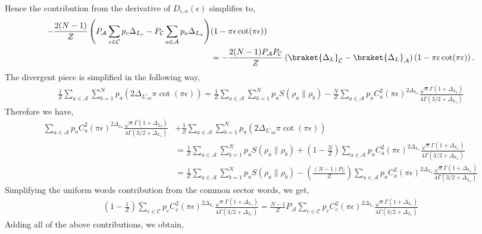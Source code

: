 \documentclass[11pt]{article}
\newcommand{\ep}{\epsilon}
\newcommand{\nn}{\nonumber}
\newcommand{\lb}{\left(}
\newcommand{\rb}{\right)}
\begin{document}
Hence the contribution from the derivative of $D_{i,n}(\ep)$ simplifies to,
\begin{align}
    -\frac{2(N-1)}{Z} \lb  P_\mathcal{A}\sum_{c\in\mathcal{C}} p_c\Delta_{L_c} - P_\mathcal{C} \sum_{a\in\mathcal{A}} p_a\Delta_{L_a} \rb &(1-\pi \ep\cot(\pi\ep))  \nn \\&=-\frac{2(N-1) P_\mathcal{A} P_\mathcal{C}}{Z}\lb\braket{\Delta_L}_{\mathcal{C}} - \braket{\Delta_L}_\mathcal{A}\rb \lb1-\pi\ep \cot(\pi\ep)\rb.
\end{align}
The divergent piece is simplified in the following way,
\begin{align}
    \frac{1}{Z}\sum_{a\in \mathcal{A}}\sum_{b=1}^Np_a\lb2\Delta_{L'_{ab}}\pi \cot(\pi\ep)\rb = \frac{1}{Z}\sum_{a\in \mathcal{A}}\sum_{b=1}^Np_a S(\rho_a \| \rho_b) - \frac{N}{Z}\sum_{a\in \mathcal{A}} p_a C_a^2
(\pi\ep)^{2\Delta_{L_a}}
\frac{\sqrt \pi \Gamma(1+ \Delta_{L_a})}{4\Gamma(3/2 + \Delta_{L_a})}
\end{align}
Therefore we have,
\begin{align}
    \sum_{a\in\mathcal{A}}p_a C_a^2
(\pi\ep)^{2\Delta_{L_a}}
\frac{\sqrt \pi \Gamma(1+ \Delta_{L_a})}{4\Gamma(3/2 + \Delta_{L_a})} &+ \frac{1}{Z}\sum_{a\in \mathcal{A}}\sum_{b=1}^Np_a\lb2\Delta_{L'_{ab}}\pi \cot(\pi\ep)\rb  \nn\\&=\frac{1}{Z}  \sum_{a\in \mathcal{A}}\sum_{b=1}^N p_a S(\rho_a\| \rho_b) 
+ \lb1-\frac{N}{Z}\rb\sum_{a\in\mathcal{A}}p_aC_a^2
(\pi\ep)^{2\Delta_{L_a}}
\frac{\sqrt \pi \Gamma(1+ \Delta_{L_a})}{4\Gamma(3/2 + \Delta_{L_a})} \\
&= \frac{1}{Z}  \sum_{a\in \mathcal{A}}\sum_{b=1}^N p_a S(\rho_a\| \rho_b) 
- \lb\frac{(N-1)P_\mathcal{C}}{Z}\rb\sum_{a\in\mathcal{A}}p_aC_a^2
(\pi\ep)^{2\Delta_{L_a}}
\frac{\sqrt \pi \Gamma(1+ \Delta_{L_a})}{4\Gamma(3/2 + \Delta_{L_a})}
\end{align}
Simplifying the uniform words contribution from the common sector words, we get,
\begin{align}
    \lb1-\frac{1}{Z}\rb
\sum_{c\in\mathcal{C}}p_c C_c^2
(\pi\ep)^{2\Delta_{L_c}}
\frac{\sqrt \pi \Gamma(1+ \Delta_{L_c})}{4\Gamma(3/2 + \Delta_{L_c})}  = \frac{N-1}{Z}P_{\mathcal{A}}\sum_{c\in \mathcal{C}} p_c C_c^2
(\pi\ep)^{2\Delta_{L_c}}\frac{\sqrt \pi \Gamma(1+ \Delta_{L_c})}{4\Gamma(3/2 + \Delta_{L_c})}
\end{align}
Adding all of the above contributions, we obtain,
\end{document}
